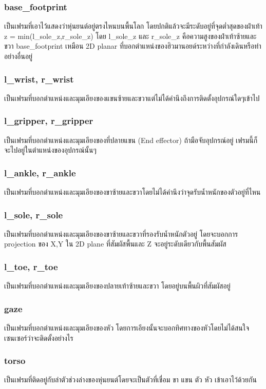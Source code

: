 \subsubsection*{base\_footprint}
เป็นเฟรมที่เอาไว้แสดงว่าหุ่นยนต์อยู่ตรงไหนบนพื้นโลก โดยปกติแล้วจะมีระดับอยู่ที่จุดต่ำสุดของฝ่าเท้า z = min(l\_sole\_z,r\_sole\_z)
โดย l\_sole\_z และ r\_sole\_z คือความสูงของฝ่าเท้าซ้ายและขวา base\_footprint เหมือน 2D planar
ที่บอกตำแหน่งของฮิวมานอยด์ระหว่างที่กำลังเดินหรือทำอย่างอื่นอยู่

\subsubsection*{l\_wrist, r\_wrist}
เป็นเฟรมที่บอกตำแหน่งและมุมเอียงของแขนซ้ายและขวาแต่ไม่ได้คำนึงถึงการติดตั้งอุปกรณ์ใดๆเข้าไป

\subsubsection*{l\_gripper, r\_gripper}
เป็นเฟรมที่บอกตำแหน่งและมุมเอียงของที่ปลายแขน (End effector) ถ้ามือจับอุปกรณ์อยู่ เฟรมนี้ก็จะไปอยู่ในตำแหน่งของอุปกรณ์นั้นๆ

\subsubsection*{l\_ankle, r\_ankle}
เป็นเฟรมที่บอกตำแหน่งและมุมเอียงของขาซ้ายและขวาโดยไม่ได้คำนึงว่าจุดรับน้ำหนักของตัวอยู่ที่ไหน

\subsubsection*{l\_sole, r\_sole}
เป็นเฟรมที่บอกตำแหน่งและมุมเอียงของขาซ้ายและขวาที่รองรับน้ำหนักตัวอยู่ โดยจะบอกการ projection ของ X,Y ใน 2D plane ที่สัมผัสพื้นและ Z จะอยู่ระดับเดียวกับพื้นสัมผัส

\subsubsection*{l\_toe, r\_toe}
เป็นเฟรมที่บอกตำแหน่งและมุมเอียงของปลายเท้าซ้ายและขวา โดยอยู่บนพื้นผิวที่สัมผัสอยู่

\subsubsection*{gaze}
เป็นเฟรมที่บอกตำแหน่งและมุมเอียงของหัว โดยการเอียงนั้นจะบอกทิศทางของหัวโดยไม่ได้สนใจเซนเซอร์ว่าจะติดตั้งอย่างไร

\subsubsection*{torso}
เป็นเฟรมที่ติดอยู่กับลำตัวช่วงล่างของหุ่นยนต์โดยจะเป็นตัวที่เชื่อม ขา แขน ตัว หัว เข้าเอาไว้ด้วยกัน

